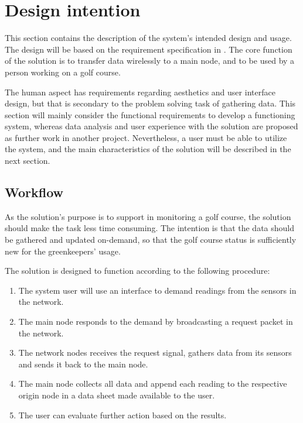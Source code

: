 \section{Design intention}
This section contains the description of the system's intended design and usage. The design will be based on the requirement specification in . The core function of the solution is to transfer data wirelessly to a main node, and to be used by a person working on a golf course. 

The human aspect has requirements regarding aesthetics and user interface design, but that is secondary to the problem solving task of gathering data. This section will mainly consider the functional requirements to develop a functioning system, whereas data analysis and user experience with the solution are proposed as further work in another project. Nevertheless, a user must be able to utilize the system, and the main characteristics of the solution will be described in the next section.

\subsection{Workflow}
As the solution's purpose is to support in monitoring a golf course, the solution should make the task less time consuming. The intention is that the data should be gathered and updated on-demand, so that the golf course status is sufficiently new for the greenkeepers' usage.

The solution is designed to function according to the following procedure:
\begin{enumerate}
	\item The system user will use an interface to demand readings from the sensors in the network.
	\item The main node responds to the demand by broadcasting a request packet in the network.
	\item The network nodes receives the request signal, gathers data from its sensors and sends it back to the main node.
	\item The main node collects all data and append each reading to the respective origin node in a data sheet made available to the user.
	\item The user can evaluate further action based on the results.
\end{enumerate}


